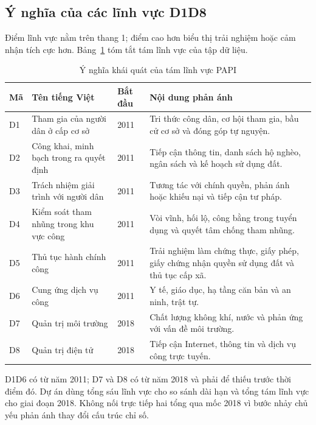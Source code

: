 \subsection{Ý nghĩa của các lĩnh vực D1\textendash D8}

Điểm lĩnh vực nằm trên thang 1; điểm cao hơn biểu thị trải nghiệm hoặc cảm nhận tích cực hơn. Bảng~\ref{tab:papi-dimensions} tóm tắt tám lĩnh vực của tập dữ liệu.

\begin{table}[htbp]
    \centering
    \caption{Ý nghĩa khái quát của tám lĩnh vực PAPI}
    \label{tab:papi-dimensions}
    \small
    \begin{tabularx}{\textwidth}{@{}p{}p{}p{}X@{}}
        \toprule
        \textbf{Mã} & \textbf{Tên tiếng Việt} & \textbf{Bắt đầu} & \textbf{Nội dung phản ánh} \\
        \midrule
        D1 & Tham gia của người dân ở cấp cơ sở & 2011 & Tri thức công dân, cơ hội tham gia, bầu cử cơ sở và đóng góp tự nguyện. \\
        D2 & Công khai, minh bạch trong ra quyết định & 2011 & Tiếp cận thông tin, danh sách hộ nghèo, ngân sách và kế hoạch sử dụng đất. \\
        D3 & Trách nhiệm giải trình với người dân & 2011 & Tương tác với chính quyền, phản ánh hoặc khiếu nại và tiếp cận tư pháp. \\
        D4 & Kiểm soát tham nhũng trong khu vực công & 2011 & Vòi vĩnh, hối lộ, công bằng trong tuyển dụng và quyết tâm chống tham nhũng. \\
        D5 & Thủ tục hành chính công & 2011 & Trải nghiệm làm chứng thực, giấy phép, giấy chứng nhận quyền sử dụng đất và thủ tục cấp xã. \\
        D6 & Cung ứng dịch vụ công & 2011 & Y tế, giáo dục, hạ tầng căn bản và an ninh, trật tự. \\
        D7 & Quản trị môi trường & 2018 & Chất lượng không khí, nước và phản ứng với vấn đề môi trường. \\
        D8 & Quản trị điện tử & 2018 & Tiếp cận Internet, thông tin và dịch vụ công trực tuyến. \\
        \bottomrule
    \end{tabularx}
\end{table}

D1\textendash D6 có từ năm 2011; D7 và D8 có từ năm 2018 và phải để thiếu trước thời điểm đó. Dự án dùng tổng sáu lĩnh vực cho so sánh dài hạn và tổng tám lĩnh vực cho giai đoạn 2018. Không nối trực tiếp hai tổng qua mốc 2018 vì bước nhảy chủ yếu phản ánh thay đổi cấu trúc chỉ số.

